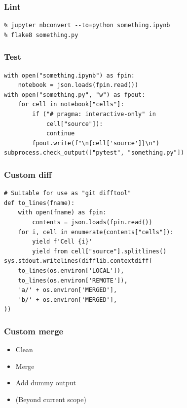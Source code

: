 \begin{frame}[fragile]

\frametitle{Lint}

\begin{lstlisting}
% jupyter nbconvert --to=python something.ipynb
% flake8 something.py
\end{lstlisting}

\end{frame}

\begin{frame}[fragile]
\frametitle{Test}

\begin{lstlisting}
with open("something.ipynb") as fpin:
    notebook = json.loads(fpin.read())
with open("something.py", "w") as fpout:
    for cell in notebook["cells"]:
        if ("# pragma: interactive-only" in
            cell["source"]):
            continue
        fpout.write(f"\n{cell['source']}\n")
subprocess.check_output(["pytest", "something.py"])
\end{lstlisting}

\end{frame}


\begin{frame}[fragile]
\frametitle{Custom diff}

\begin{lstlisting}
# Suitable for use as "git difftool"
def to_lines(fname):
    with open(fname) as fpin:
        contents = json.loads(fpin.read())
    for i, cell in enumerate(contents["cells"]):
        yield f'Cell {i}'
        yield from cell["source"].splitlines()
sys.stdout.writelines(difflib.contextdiff(
    to_lines(os.environ['LOCAL']),
    to_lines(os.environ['REMOTE']),
    'a/' + os.environ['MERGED'],
    'b/' + os.environ['MERGED'],
))
\end{lstlisting}


\end{frame}

\begin{frame}
\frametitle{Custom merge}

\begin{itemize}
\item Clean
\item Merge
\item Add dummy output
\item (Beyond current scope)
\end{itemize}

\end{frame}


